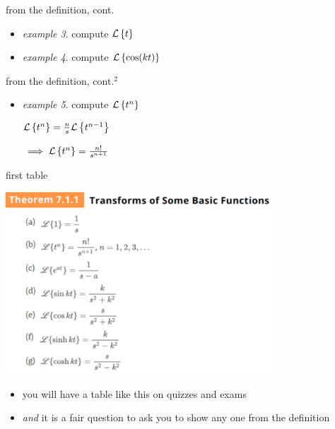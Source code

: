 \documentclass[dvipsnames,colorlinks]{beamer}
\begin{document}
\begin{frame}{from the definition, cont.}

\begin{itemize}
\item \emph{example 3}.  compute $\mathcal{L}\left\{t\right\}$

\vspace{30mm}
\item \emph{example 4}.  compute $\mathcal{L}\left\{\cos(kt)\right\}$

\vspace{35mm}
\end{itemize}
\end{frame}


\begin{frame}{from the definition, cont.$^2$}

\begin{itemize}
\item \emph{example 5}.  compute $\mathcal{L}\left\{t^n\right\}$

\vspace{50mm}
\hfill $\begin{matrix}
        \mathcal{L}\left\{t^n\right\} = \frac{n}{s} \mathcal{L}\left\{t^{n-1}\right\} \\ \\
        \implies \mathcal{L}\left\{t^n\right\} = \frac{n!}{s^{n+1}}
        \end{matrix}$
\end{itemize}
\end{frame}


\begin{frame}{first table}

\begin{center}
\includegraphics[width=0.75\textwidth]{figs/laplacetable.pdf}
\end{center}

\vspace{-4mm}
\begin{itemize}
\item you will have a table like this on quizzes and exams
\item \emph{and} it is a fair question to ask you to show any one from the definition
\end{itemize}
\end{frame}
\end{document}

